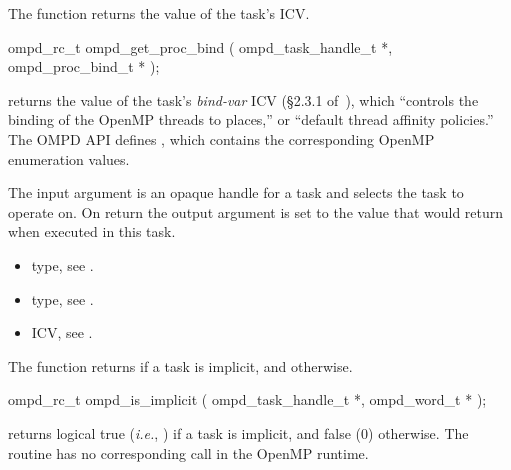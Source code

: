 %
\label{ompd:ompd_get_proc_bind}
\summary
The  function returns the value of the task's  ICV.

\format
\cspecificstart
\begin{boxedcode}
ompd\_rc\_t ompd\_get\_proc\_bind (
  ompd\_task\_handle\_t        *, 
  ompd\_proc\_bind\_t          *
); 
\end{boxedcode}
\cspecificend

\descr
{} returns the value of the task's
\emph{bind-var} ICV (\S2.3.1 of~\cite{OpenMP}), which ``controls the
binding of the OpenMP threads to places,'' or ``default thread
affinity policies.''
%
The OMPD API defines
, which
contains the corresponding OpenMP enumeration values.
%

\argdesc
The input argument  is an opaque handle for a task and selects the task to operate on.
On return the output argument  is set to the value that  would return when
executed in this task.
%

\crossreferences
\begin{itemize}
	\item {} type, see .
	\item {} type, see .
	\item {} ICV, see .
\end{itemize}

\label{ompd:ompd_is_implicit}
\summary
The  function returns  if a task is implicit, and  otherwise.

\format
\cspecificstart
\begin{boxedcode}
ompd\_rc\_t ompd\_is\_implicit (
  ompd\_task\_handle\_t  *,
  ompd\_word\_t        * 
); 
\end{boxedcode}
\cspecificend

\descr
{} returns logical true (\textit{i.e.}, )
if a task is implicit, and false (0) otherwise.
The routine has no corresponding call in the OpenMP runtime.

